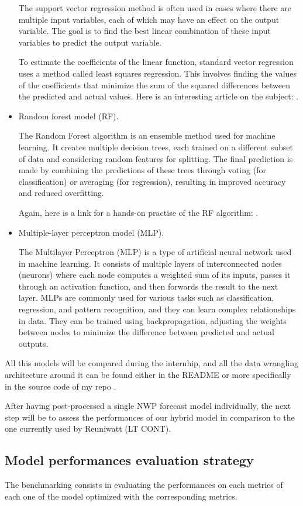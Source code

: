 \begin{itemize}
    The support vector regression method is often used in cases where there are multiple input variables, each of which may have an effect on the output variable. The goal is to find the best linear combination of these input variables to predict the output variable.

To estimate the coefficients of the linear function, standard vector regression uses a method called least squares regression. This involves finding the values of the coefficients that minimize the sum of the squared differences between the predicted and actual values.
    Here is an interesting article on the subject: \cite{SVR}.
    \item Random forest model (RF).

    The Random Forest algorithm is an ensemble method used for machine learning. It creates multiple decision trees, each trained on a different subset of data and considering random features for splitting. The final prediction is made by combining the predictions of these trees through voting (for classification) or averaging (for regression), resulting in improved accuracy and reduced overfitting.

Again, here is a link for a hands-on practise of the RF algorithm: \cite{RF}.
    \item Multiple-layer perceptron model (MLP).

The Multilayer Perceptron (MLP) is a type of artificial neural network used in machine learning. It consists of multiple layers of interconnected nodes (neurons) where each node computes a weighted sum of its inputs, passes it through an activation function, and then forwards the result to the next layer. MLPs are commonly used for various tasks such as classification, regression, and pattern recognition, and they can learn complex relationships in data. They can be trained using backpropagation, adjusting the weights between nodes to minimize the difference between predicted and actual outputs.

\end{itemize}
All this models will be compared during the internhip, and all the data wrangling architecture around it can be found either in the README or more specifically in the source code of my repo \cite{myrepo}.

After having post-processed a single NWP forecast model individually, the next step will be to assess the performances of our hybrid model in comparison to the one currently used by Reuniwatt (LT CONT).
\subsection{Model performances evaluation strategy}
The benchmarking consists in evaluating the performances on each metrics of each one of the model optimized with the corresponding metrics.

